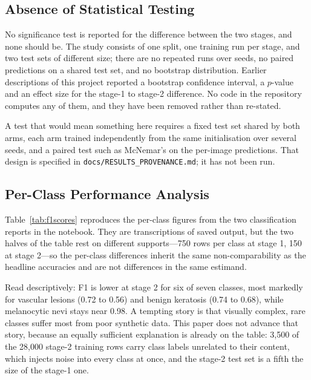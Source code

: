 \documentclass[ai,article,submit,pdftex,moreauthors]{Definitions/mdpi}
\begin{document}
\subsection{Absence of Statistical Testing}

No significance test is reported for the difference between the two stages, and none should be. The study consists of one split, one training run per stage, and two test sets of different size; there are no repeated runs over seeds, no paired predictions on a shared test set, and no bootstrap distribution. Earlier descriptions of this project reported a bootstrap confidence interval, a $p$-value and an effect size for the stage-1 to stage-2 difference. No code in the repository computes any of them, and they have been removed rather than re-stated.

A test that would mean something here requires a fixed test set shared by both arms, each arm trained independently from the same initialisation over several seeds, and a paired test such as McNemar's on the per-image predictions. That design is specified in \texttt{docs/RESULTS\_PROVENANCE.md}; it has not been run.

\subsection{Per-Class Performance Analysis}

Table~\ref{tab:f1scores} reproduces the per-class figures from the two classification reports in the notebook. They are transcriptions of saved output, but the two halves of the table rest on different supports---750 rows per class at stage 1, 150 at stage 2---so the per-class differences inherit the same non-comparability as the headline accuracies and are not differences in the same estimand.

Read descriptively: F1 is lower at stage 2 for six of seven classes, most markedly for vascular lesions (0.72 to 0.56) and benign keratosis (0.74 to 0.68), while melanocytic nevi stays near 0.98. A tempting story is that visually complex, rare classes suffer most from poor synthetic data. This paper does not advance that story, because an equally sufficient explanation is already on the table: 3,500 of the 28,000 stage-2 training rows carry class labels unrelated to their content, which injects noise into every class at once, and the stage-2 test set is a fifth the size of the stage-1 one.
\end{document}
